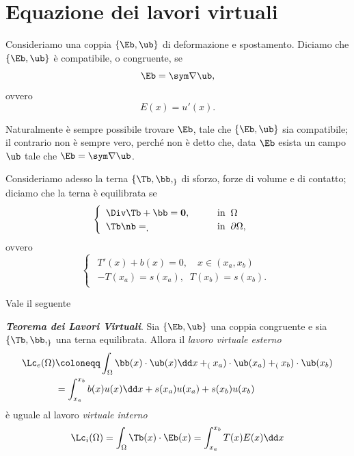 \section{Equazione dei lavori virtuali}
Consideriamo una coppia $\{\Eb, \ub\}$ di deformazione e spostamento. Diciamo che $\{\Eb, \ub\}$  è compatibile, o congruente, se
\begin{equation}
	\Eb =\sym \nabla \ub,
\end{equation}
ovvero
\begin{equation}\label{cong1}
	E(x)=u'(x).
\end{equation}

Naturalmente è sempre possibile trovare $\Eb$, tale che $\{\Eb, \ub\}$  sia compatibile; il contrario non è sempre vero, perché non è detto che, data $\Eb$ esista un campo $\ub$ tale che $\Eb =\sym \nabla \ub$.

Consideriamo adesso la terna $\{\Tb, \bb, \sb\}$ di sforzo, forze di volume e di contatto; diciamo che la terna  è equilibrata se
\begin{equation}
\begin{cases}
	\begin{array}{ll}
		\Div\Tb +\bb= \mathbf{0}, & \qquad \text{in}\;\; \Omega \\
		\Tb\nb=\sb, & \qquad \text{in}\;\; \partial\Omega,
	\end{array}
\end{cases}
\end{equation}
ovvero
	\begin{equation}\label{bil1}
		\begin{cases}
			\begin{array}{ll}
				T'(x)+b(x)=0, \quad  x\in(x_a,x_b) \\
				-T(x_a)=s(x_a),\;\;T(x_b)=s(x_b).
			\end{array}
		\end{cases}
\end{equation}

Vale il seguente 
\begin{definition}
\textbf{\textit{Teorema dei Lavori Virtuali}}. Sia $\{\Eb, \ub\}$  una coppia congruente e sia $\{\Tb, \bb, \sb\}$ una terna equilibrata. Allora il \textit{lavoro virtuale esterno}
\begin{equation}
\begin{aligned}
	\Lc_e(\Omega)&\coloneqq\int_{\Omega}\bb(x)\cdot \ub(x)\dd x+\sb(x_a)\cdot\ub(x_a)+\sb(x_b)\cdot\ub(x_b)\\
	&=\int_{x_a}^{x_b}b(x)u(x)\dd x+s(x_a)u(x_a)+s(x_b)u(x_b)
\end{aligned}
\end{equation}
è uguale al lavoro \textit{virtuale interno }
	\begin{equation}
\Lc_i(\Omega)=\int_{\Omega}\Tb(x)\cdot \Eb(x)=\int_{x_a}^{x_b}T(x) E(x)\dd x
\end{equation}
\end{definition}

